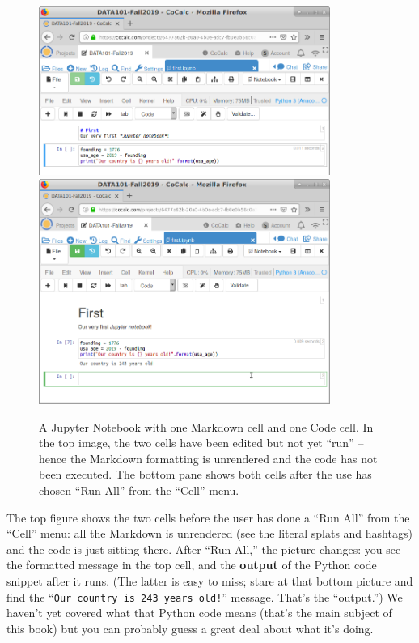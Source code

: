 \begin{figure}[!h]
\centering
\includegraphics[width=0.85\textwidth]{firstNotebook.png} \\
\bigskip
\includegraphics[width=0.85\textwidth]{firstNotebook2.png}
\medskip
\caption{A Jupyter Notebook with one Markdown cell and one Code cell. In the
top image, the two cells have been edited but not yet ``run'' -- hence
the Markdown formatting is unrendered and the code has not been executed. The
bottom pane shows both cells after the use has chosen ``Run All'' from the
``Cell'' menu.}
\label{fig:jupyterNotebook}
\end{figure}

The top figure shows the two cells before the user has done a ``Run All'' from
the ``Cell'' menu: all  
the Markdown is unrendered (see the literal splats and hashtags) and the code
is just sitting there. After ``Run All,'' the picture changes:
you see the formatted message in the top cell, and the \textbf{output} of the
Python code snippet after it runs. (The latter is easy to miss; stare at that
bottom picture and find the ``\texttt{Our country is 243 years old!}'' message.
That's the ``output.'') We haven't yet covered what that Python code means
(that's the main subject of this book) but you can probably guess a great deal
about what it's doing.

